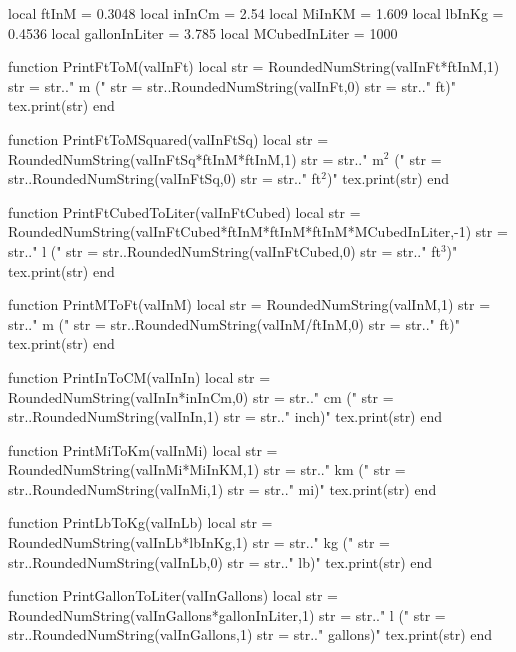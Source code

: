 \begin{luacode}
	local ftInM = 0.3048
	local inInCm = 2.54
	local MiInKM = 1.609
	local lbInKg = 0.4536
	local gallonInLiter = 3.785
	local MCubedInLiter = 1000
	
	function PrintFtToM(valInFt)
		local str = RoundedNumString(valInFt*ftInM,1)
		str = str.." m ("
		str = str..RoundedNumString(valInFt,0)
		str = str.." ft)"
		tex.print(str)
	end

	function PrintFtToMSquared(valInFtSq)
		local str = RoundedNumString(valInFtSq*ftInM*ftInM,1)
		str = str.." m$^2$ ("
		str = str..RoundedNumString(valInFtSq,0)
		str = str.." ft$^2$)"
		tex.print(str)
	end

	function PrintFtCubedToLiter(valInFtCubed)
		local str = RoundedNumString(valInFtCubed*ftInM*ftInM*ftInM*MCubedInLiter,-1)
		str = str.." l ("
		str = str..RoundedNumString(valInFtCubed,0)
		str = str.." ft$^3$)"
		tex.print(str)
	end
	
	function PrintMToFt(valInM)
		local str = RoundedNumString(valInM,1)
		str = str.." m ("
		str = str..RoundedNumString(valInM/ftInM,0)
		str = str.." ft)"
		tex.print(str)
	end

	function PrintInToCM(valInIn)
		local str = RoundedNumString(valInIn*inInCm,0)
		str = str.." cm ("
		str = str..RoundedNumString(valInIn,1)
		str = str.." inch)"
		tex.print(str)
	end

	function PrintMiToKm(valInMi)
		local str = RoundedNumString(valInMi*MiInKM,1)
		str = str.." km ("
		str = str..RoundedNumString(valInMi,1)
		str = str.." mi)"
		tex.print(str)
	end

	function PrintLbToKg(valInLb)
		local str = RoundedNumString(valInLb*lbInKg,1)
		str = str.." kg ("
		str = str..RoundedNumString(valInLb,0)
		str = str.." lb)"
		tex.print(str)
	end

	function PrintGallonToLiter(valInGallons)
		local str = RoundedNumString(valInGallons*gallonInLiter,1)
		str = str.." l ("
		str = str..RoundedNumString(valInGallons,1)
		str = str.." gallons)"
		tex.print(str)
	end
\end{luacode}

\newcommand{\ft}[1]{
	\directlua{PrintFtToM(#1)}
}

\newcommand{\ftsquared}[1]{
	\directlua{PrintFtToMSquared(#1)}
}

\newcommand{\ftcubed}[1]{
	\directlua{PrintFtCubedToLiter(#1)}
}

\newcommand{\metre}[1]{
	\directlua{PrintMToFt(#1)}
}

\newcommand{\inch}[1]{
	\directlua{PrintInToCM(#1)}
}

\newcommand{\mile}[1]{
	\directlua{PrintMiToKm(#1)}
}

\newcommand{\lb}[1]{
	\directlua{PrintLbToKg(#1)}
}

\newcommand{\gallon}[1]{
	\directlua{PrintGallonToLiter(#1)}
}
